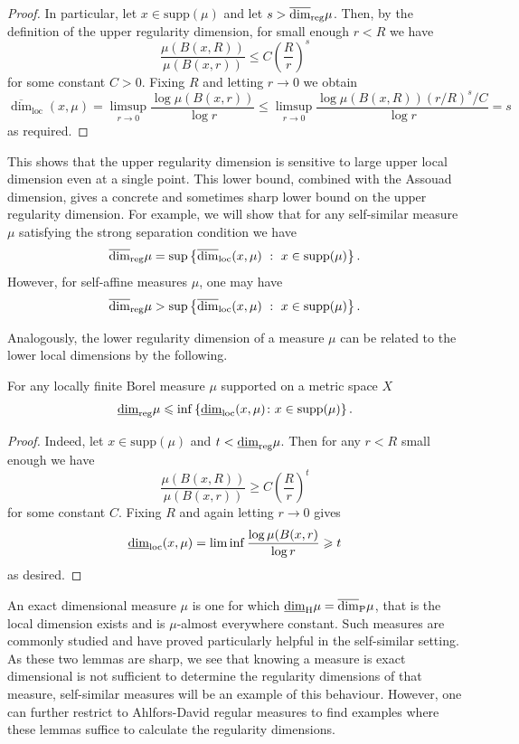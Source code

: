 \begin{proof}
In particular, let $x \in \text{supp}(\mu)$ and let $s > \overline{\dim}_{\textup{reg}} \mu$.  Then, by the definition of the upper regularity dimension, for small enough $r < R$ we have
\[
\frac{\mu(B(x,R))}{\mu(B(x,r))} \leq C\left(\frac{R}{r}\right)^{s}
\]
for some constant $C>0$.  Fixing $R$ and letting $r \to 0$ we obtain
\[
\overline{\dim}_{\text{loc}}(x,\mu)=\limsup_{r\rightarrow 0} \frac{\log \mu(B(x,r))}{\log r} \leq  \limsup_{r\rightarrow 0} \frac{\log \mu(B(x,R)) (r/R)^s/C }{\log r}  = s
\]
as required. 
\end{proof}

This shows that the upper regularity dimension is sensitive to large upper local dimension even at a single point. This lower bound, combined with the Assouad dimension, gives a concrete and sometimes sharp lower bound on the upper regularity dimension. For example, we will show that for any self-similar measure $\mu$ satisfying the strong separation condition we have 
$$ \overline{\dim}_{\textup{reg}} \mu = \sup \left\{ \overline{\dim}_{\text{loc}}(x,\mu) \ : \  x\in \text{supp}(\mu) \right\}.$$
However, for self-affine measures $\mu$, one may have
\[
\overline{\dim}_{\textup{reg}} \mu >  \sup \left\{ \overline{\dim}_{\text{loc}}(x,\mu) \ : \  x\in \text{supp}(\mu) \right\}.
\]

Analogously, the lower regularity dimension of a measure $\mu$ can be related to the lower local dimensions by the following.
\begin{lemma}
For any locally finite Borel measure $\mu$ supported on a metric space $X$
\[
\underline{\dim}_{\textup{reg}} \mu \leqslant \inf \left\{\underline{\dim}_{\textup{loc}}(x,\mu) \colon x \in \text{supp}(\mu) \right\}.
\]
\end{lemma}
\begin{proof}
Indeed, let $x\in \text{supp}(\mu)$ and $t < \underline{\dim}_{\textup{reg}} \mu$. Then for any $r < R$ small enough we have
\[
\frac{\mu(B(x,R))}{\mu(B(x,r))} \geq C\left(\frac{R}{r}\right)^{t}
\]
for some constant $C$. Fixing $R$ and again letting $r \rightarrow 0$ gives
\[
\underline{\dim}_{\textup{loc}}(x,\mu) = \liminf \frac{\log \mu(B(x,r)}{\log r} \geqslant t
\]
as desired.
\end{proof}

An exact dimensional measure $\mu$ is one for which $\underline{\dim}_{\textup{H}} \mu = \overline{\dim}_{\textup{P}}\mu$, that is the local dimension exists and is $\mu$-almost everywhere constant. Such measures are commonly studied and have proved particularly helpful in the self-similar setting. As these two lemmas are sharp, we see that knowing a measure is exact dimensional is not sufficient to determine the regularity dimensions of that measure, self-similar measures will be an example of this behaviour. However, one can further restrict to Ahlfors-David regular measures to find examples where these lemmas suffice to calculate the regularity dimensions.  


